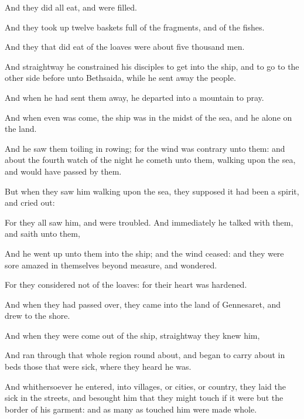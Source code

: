 {And they
did
all
eat,
and were
filled.

And they took
up
twelve
baskets
full of the
fragments,
and
of the
fishes.

And they
that did
eat of the
loaves
were
about five
thousand
men.

And
straightway he
constrained
his
disciples to
get
into the
ship,
and to
go
to the other
side before
unto
Bethsaida,
while
he sent
away the
people.

And when he had
sent
them
away, he
departed
into a
mountain to
pray.

And when
even was
come, the
ship
was
in the
midst of the
sea,
and
he
alone
on the
land.

And he
saw
them
toiling
in
rowing;
for the
wind
was
contrary unto
them:
and
about the
fourth
watch of the
night he
cometh
unto
them,
walking
upon the
sea,
and would
have passed
by
them.

But when they
saw
him
walking
upon the
sea, they
supposed it had
been a
spirit,
and cried
out:

For
they
all
saw
him,
and were
troubled.
And
immediately he
talked
with
them,
and
saith unto
them,
{}

And he went
up
unto
them
into the
ship;
and the
wind
ceased:
and they were
sore
amazed
in
themselves
beyond
measure,
and
wondered.

For they
considered
not
{}
of the
loaves:
for
their
heart
was
hardened.

And when they had passed
over, they
came
into the
land of
Gennesaret,
and drew to the
shore.

And when
they were come
out
of the
ship,
straightway they
knew
him,

And ran
through
that
whole region round
about, and
began to carry
about
in
beds those
that
were
sick,
where they
heard he
was.

And
whithersoever he
entered,
into
villages,
or
cities,
or
country, they
laid the
sick
in the
streets,
and
besought
him
that they might
touch if it were
but the
border of
his
garment:
and as many
as
touched
him were made
whole.




\par }
